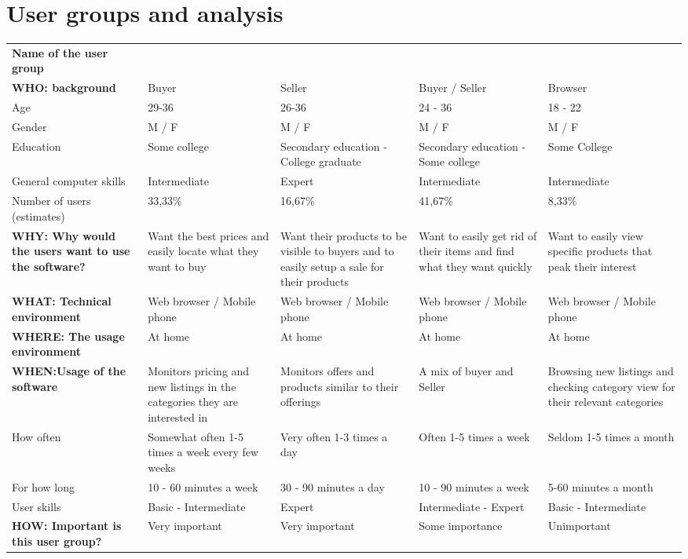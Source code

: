 \section{User groups and analysis}
\begin{tabular}{|p{2.5cm}|p{2.5cm}|p{2.5cm}|p{2.5cm}|p{2.5cm}|}
\hline
\rowcolor[HTML]{93C47D} 
\textbf{Name   of the user group} & & & & \\
\rowcolor[HTML]{D9D9D9} 
\textbf{WHO: background} & Buyer & Seller & Buyer / Seller & Browser \\ \hline
Age & 29-36 & 26-36 & 24 - 36 & 18 - 22 \\ \hline
Gender & M / F & M / F & M / F & M / F \\ \hline
Education & Some college & Secondary education - College graduate & Secondary education - Some college & Some College\\ \hline
General computer skills & Intermediate & Expert & Intermediate & Intermediate \\\hline
Number of users (estimates) & 33,33\% & 16,67\% & 41,67\% & 8,33\% \\ \hline
\rowcolor[HTML]{D9D9D9}
\textbf{WHY: Why would the users want to use the software?} & Want the best prices and easily locate what they want to buy & Want their products to be visible to buyers and to easily setup a sale for their   products & Want to easily get rid of their items and find what they want quickly & Want to easily view specific products that peak their interest \\ \hline
\rowcolor[HTML]{D9D9D9} 
\textbf{WHAT: Technical environment} & Web browser / Mobile phone & Web browser / Mobile phone & Web   browser / Mobile phone & Web browser / Mobile phone \\ \hline
\rowcolor[HTML]{D9D9D9} 
\textbf{WHERE: The usage environment} & At home & At home & At home & At home \\ \hline
\rowcolor[HTML]{D9D9D9} 
\textbf{WHEN:Usage of the software} & Monitors pricing and new listings in the categories they are   interested in & Monitors offers and products similar to their offerings & A mix of   buyer and Seller & Browsing new listings and checking category view for their relevant categories \\ \hline
How often & Somewhat often 1-5 times a week every few weeks & Very often 1-3 times a day & Often 1-5   times a week & Seldom 1-5 times a month \\ \hline
For how long & 10 - 60 minutes a week & 30 - 90 minutes a day & 10 - 90 minutes a week & 5-60   minutes a month \\ \hline
User skills & Basic - Intermediate & Expert & Intermediate - Expert & Basic - Intermediate \\ \hline
\rowcolor[HTML]{93C47D} 
\textbf{HOW: Important is this user group?} & Very important & Very important & Some importance & Unimportant \\\hline
\end{tabular}
